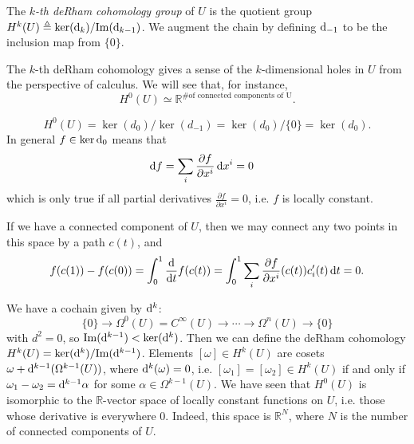 \begin{defn}
The \emph{$k$-th deRham cohomology group} of $U$ is the quotient group
$H^k(U) \triangleq \ker(\mathop{}\!\mathrm{d}_k) / \mathrm{Im}(\mathop{}\!\mathrm{d}_{k-1})$. We augment
the chain by defining $\mathop{}\!\mathrm{d}_{-1}$ to be the inclusion map from $\{ 0 \}$.
\end{defn}

\begin{remark}
The $k$-th deRham cohomology gives a sense of the $k$-dimensional
holes in $U$ from the perspective of calculus. We will see that, for instance,
$$
H^0(U) \simeq \mathbb{R}^{\text{\# of connected components of U}}.
$$
\end{remark}

\begin{xmpl}
$$
  H^0(U)
= \ker(d_0) / \ker(d_{-1})
= \ker(d_0) / \{ 0 \}
= \ker(d_0).
$$
In general $f \in \ker \mathop{}\!\mathrm{d}_0$ means that
\begin{align*}
   \mathop{}\!\mathrm{d} f
&= \sum_i
     \frac{\partial f}{\partial x^i}
     \mathop{}\!\mathrm{d} x^i = 0
\end{align*}
which is only true if all partial derivatives
$\frac{\partial f}{\partial x^i} = 0$, i.e. $f$ is locally constant.

If we have a connected component of $U$, then we may connect any two
points in this space by a path $c(t)$, and
$$
  f(c(1)) - f(c(0))
= \int_0^1 \frac{\mathop{}\!\mathrm{d}}{\mathop{}\!\mathrm{d} t} f(c(t))
= \int_0^1
    \sum_i
      \frac{\partial f}
           {\partial x^i}
      (c(t)) c_i^\prime(t)
      \mathop{}\!\mathrm{d} t
= 0.
$$
\end{xmpl}

We have a cochain given by $\mathop{}\!\mathrm{d}^k$:
$$
    \{ 0 \}
\to \Omega^0(U) = C^\infty(U)
\to \cdots
\to \Omega^n(U)
\to \{ 0 \}
$$
with $d^2 = 0$,
so $\mathrm{Im}(\mathop{}\!\mathrm{d}^{k-1}) < \ker(\mathop{}\!\mathrm{d}^k)$. Then we can define the
deRham cohomology $H^k(U) = \ker(\mathop{}\!\mathrm{d}^k) / \mathrm{Im}(\mathop{}\!\mathrm{d}^{k-1})$.
Elements $[\omega] \in H^k(U)$ are cosets
$\omega + \mathop{}\!\mathrm{d}^{k-1}(\Omega^{k-1}(U))$, where $\mathop{}\!\mathrm{d}^k(\omega) = 0$,
i.e. $[\omega_1] = [\omega_2] \in H^k(U)$ if and only if
$\omega_1 - \omega_2 = \mathop{}\!\mathrm{d}^{k-1} \alpha$ for some
$\alpha \in \Omega^{k-1}(U)$. We have seen that
$H^0(U)$ is isomorphic to the $\mathbb{R}$-vector space of locally
constant functions on $U$, i.e. those whose derivative is everywhere
0. Indeed, this space is $\mathbb{R}^N$, where $N$ is the number of
connected components of $U$.

